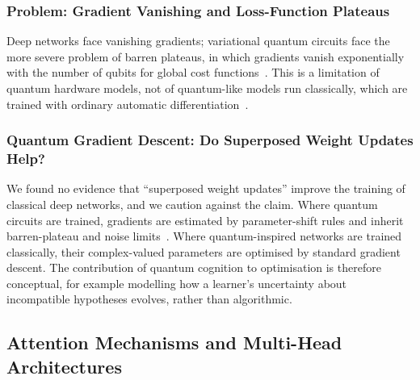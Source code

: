 \documentclass[pdflatex,sn-basic]{sn-jnl}
\begin{document}
\subsubsection{Problem: Gradient Vanishing and Loss-Function Plateaus}
Deep networks face vanishing gradients; variational quantum circuits face the more severe problem of barren plateaus, in which gradients vanish exponentially with the number of qubits for global cost functions~\citep{Cerezo2021}. This is a limitation of quantum hardware models, not of quantum-like models run classically, which are trained with ordinary automatic differentiation~\citep{Bergholm2018,Broughton2020}.

\subsubsection{Quantum Gradient Descent: Do Superposed Weight Updates Help?}
We found no evidence that ``superposed weight updates'' improve the training of classical deep networks, and we caution against the claim. Where quantum circuits are trained, gradients are estimated by parameter-shift rules and inherit barren-plateau and noise limits~\citep{Cerezo2021,Preskill2018}. Where quantum-inspired networks are trained classically, their complex-valued parameters are optimised by standard gradient descent. The contribution of quantum cognition to optimisation is therefore conceptual, for example modelling how a learner's uncertainty about incompatible hypotheses evolves, rather than algorithmic.

\subsection{Attention Mechanisms and Multi-Head Architectures}\label{sec:llm}
\end{document}
